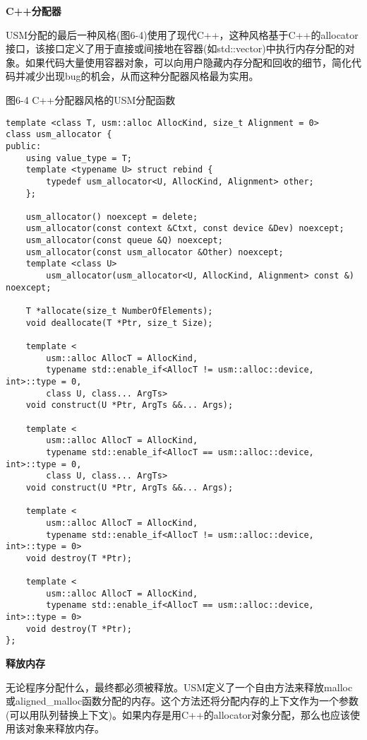 \hspace*{\fill} \par %
\textbf{C++分配器}

USM分配的最后一种风格(图6-4)使用了现代C++，这种风格基于C++的allocator接口，该接口定义了用于直接或间接地在容器(如std::vector)中执行内存分配的对象。如果代码大量使用容器对象，可以向用户隐藏内存分配和回收的细节，简化代码并减少出现bug的机会，从而这种分配器风格最为实用。\par

\hspace*{\fill} \par %
图6-4 C++分配器风格的USM分配函数
\begin{lstlisting}[caption={}]
template <class T, usm::alloc AllocKind, size_t Alignment = 0>
class usm_allocator {
public:
	using value_type = T;
	template <typename U> struct rebind {
		typedef usm_allocator<U, AllocKind, Alignment> other;
	};

	usm_allocator() noexcept = delete;
	usm_allocator(const context &Ctxt, const device &Dev) noexcept;
	usm_allocator(const queue &Q) noexcept;
	usm_allocator(const usm_allocator &Other) noexcept;
	template <class U> 
		usm_allocator(usm_allocator<U, AllocKind, Alignment> const &) noexcept;
		
	T *allocate(size_t NumberOfElements); 
	void deallocate(T *Ptr, size_t Size); 
	
	template <
		usm::alloc AllocT = AllocKind,
		typename std::enable_if<AllocT != usm::alloc::device, int>::type = 0,
		class U, class... ArgTs>
	void construct(U *Ptr, ArgTs &&... Args); 
	
	template <
		usm::alloc AllocT = AllocKind,
		typename std::enable_if<AllocT == usm::alloc::device, int>::type = 0,
		class U, class... ArgTs>
	void construct(U *Ptr, ArgTs &&... Args); 
	
	template <
		usm::alloc AllocT = AllocKind,
		typename std::enable_if<AllocT != usm::alloc::device, int>::type = 0>
	void destroy(T *Ptr);
	
	template <
		usm::alloc AllocT = AllocKind,
		typename std::enable_if<AllocT == usm::alloc::device, int>::type = 0>
	void destroy(T *Ptr);
};
\end{lstlisting}

\hspace*{\fill} \par %
\textbf{释放内存}

无论程序分配什么，最终都必须被释放。USM定义了一个自由方法来释放malloc或aligned\_malloc函数分配的内存。这个方法还将分配内存的上下文作为一个参数(可以用队列替换上下文)。如果内存是用C++的allocator对象分配，那么也应该使用该对象来释放内存。\par

